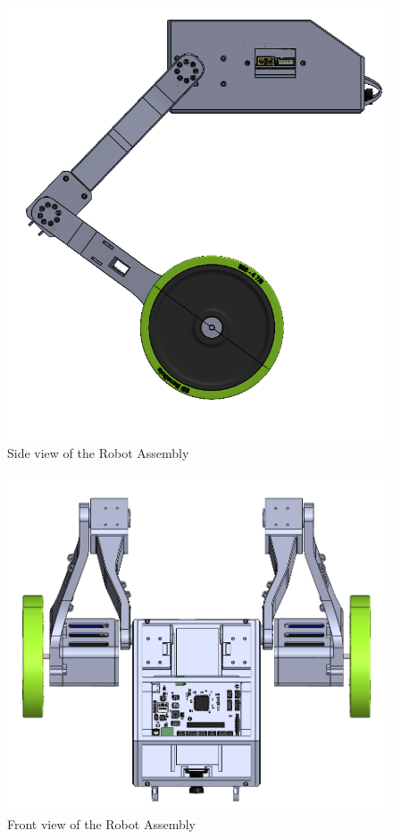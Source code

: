 \begin{figure}[h]
	\centering
	\includegraphics[width=1\linewidth]{Robot_Assembly_1}
	\caption[Side view of the Robot Assembly]{Side view of the Robot Assembly}
	\label{fig:robotassembly1}
\end{figure}
\begin{figure}[h]
	\centering
	\includegraphics[width=1\linewidth]{Robot_Assembly_2}
	\caption[Front view of the Robot Assembly]{Front view of the Robot Assembly}
	\label{fig:robotassembly2}
\end{figure}

